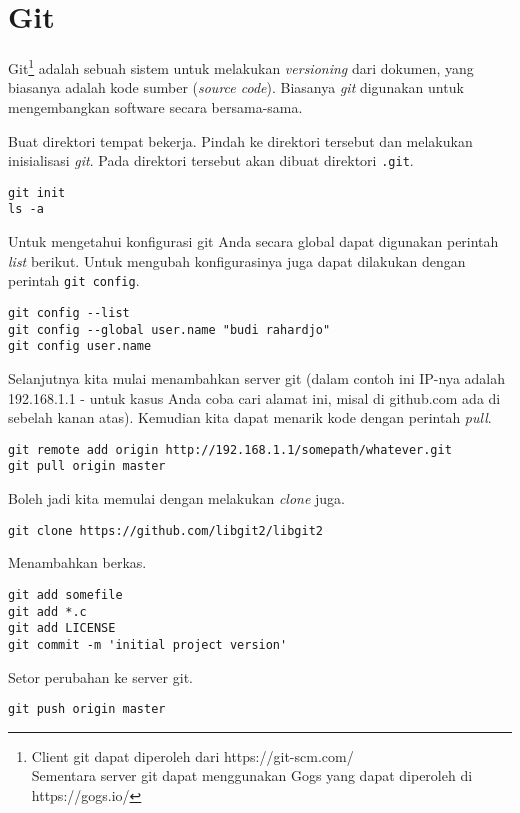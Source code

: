 \chapter{Git}
Git\footnote{Client git dapat diperoleh dari https://git-scm.com/\\
Sementara server git dapat menggunakan Gogs yang dapat diperoleh di
https://gogs.io/}
adalah sebuah sistem untuk melakukan {\em versioning} dari dokumen,
yang biasanya adalah kode sumber ({\em source code}).
Biasanya {\em git} digunakan untuk mengembangkan software secara bersama-sama.

Buat direktori tempat bekerja. Pindah ke direktori tersebut dan
melakukan inisialisasi {\em git}. 
Pada direktori tersebut akan dibuat direktori \texttt{.git}.

\begin{lstlisting}
git init
ls -a
\end{lstlisting}

Untuk mengetahui konfigurasi git Anda secara global dapat digunakan
perintah {\em list} berikut. Untuk mengubah konfigurasinya juga dapat
dilakukan dengan perintah \texttt{git config}.
\begin{lstlisting}
git config --list
git config --global user.name "budi rahardjo"
git config user.name
\end{lstlisting}

Selanjutnya kita mulai menambahkan server git (dalam contoh ini
IP-nya adalah 192.168.1.1 - untuk kasus Anda coba cari alamat ini,
misal di github.com ada di sebelah kanan atas).
Kemudian kita dapat menarik kode dengan perintah {\em pull}.

\begin{lstlisting}
git remote add origin http://192.168.1.1/somepath/whatever.git
git pull origin master
\end{lstlisting}

Boleh jadi kita memulai dengan melakukan {\em clone} juga.
\begin{lstlisting}
git clone https://github.com/libgit2/libgit2
\end{lstlisting}

Menambahkan berkas.

\begin{lstlisting}
git add somefile
git add *.c
git add LICENSE
git commit -m 'initial project version'
\end{lstlisting}

Setor perubahan ke server git.

\begin{lstlisting}
git push origin master
\end{lstlisting}
